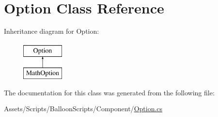 \hypertarget{classOption}{}\section{Option Class Reference}
\label{classOption}
Inheritance diagram for Option\+:\begin{figure}[H]
\begin{center}
\leavevmode
\includegraphics[height=2.000000cm]{classOption}
\end{center}
\end{figure}


The documentation for this class was generated from the following file\+:\begin{DoxyCompactItemize}
\item 
Assets/\+Scripts/\+Balloon\+Scripts/\+Component/\hyperlink{Option_8cs}{Option.\+cs}\end{DoxyCompactItemize}
